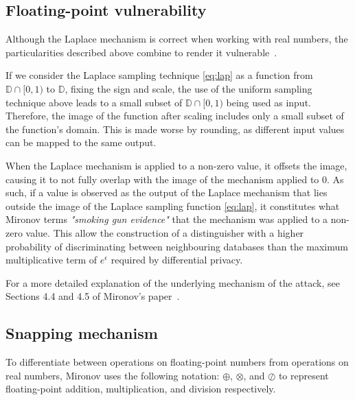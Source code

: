 \documentclass[orivec,envcountsame]{llncs}
\begin{document}
\subsection{Floating-point vulnerability}
Although the Laplace mechanism is correct when working with real numbers, 
the particularities described above combine to render it vulnerable~\cite{mironov2012significance}.

If we consider the Laplace sampling technique \ref{eq:lap} as a function from $\mathbb{D} \cap [0, 1)$ to $\mathbb{D}$, fixing the sign and scale, the use of the uniform sampling technique above leads to a small subset of $\mathbb{D} \cap [0, 1)$ being used as input. Therefore, the image of the function after scaling includes only a small subset of the function's domain. This is made worse by rounding, as different input values can be mapped to the same output.

When the Laplace mechanism is applied to a non-zero value, it offsets the image, causing it to not fully overlap with the image of the mechanism applied to 0. As such, if a value is observed as the output of the Laplace mechanism that lies outside the image of the Laplace sampling function \ref{eq:lap}, it constitutes what Mironov terms \textit{"smoking gun evidence"} that the mechanism was applied to a non-zero value. This allow the construction of a distinguisher with a higher probability of discriminating between neighbouring databases than the maximum multiplicative term of $e^\epsilon$ required by differential privacy.

For a more detailed explanation of the underlying mechanism of the attack, see Sections 4.4 and 4.5 of Mironov's paper~\cite{mironov2012significance}.

\subsection{Snapping mechanism}
To differentiate between operations on floating-point numbers from operations on real numbers, Mironov uses the following notation: $\oplus$, $\otimes$, and $\oslash$ to represent floating-point addition, multiplication, and division respectively.
\end{document}

